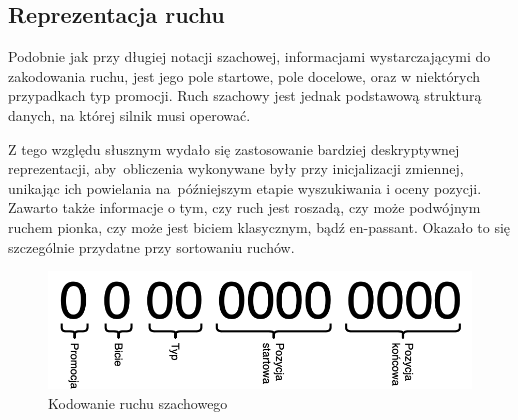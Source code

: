 \subsection{Reprezentacja ruchu}
\label{subsec:reprezentacja-ruchu}

Podobnie jak przy długiej notacji szachowej, informacjami wystarczającymi do zakodowania ruchu, jest jego pole startowe, pole docelowe, oraz w niektórych przypadkach typ promocji.
Ruch szachowy jest jednak podstawową strukturą danych, na której silnik musi operować.

Z tego względu słusznym wydało się zastosowanie bardziej deskryptywnej reprezentacji, aby~obliczenia wykonywane były przy inicjalizacji zmiennej, unikając ich powielania na~późniejszym etapie wyszukiwania i oceny pozycji.
Zawarto także informacje o tym, czy ruch jest roszadą, czy może podwójnym ruchem pionka, czy może jest biciem klasycznym, bądź en-passant.
Okazało to się szczególnie przydatne przy sortowaniu ruchów.

\begin{figure}[ht]
    \centering
    \includegraphics[width=0.85\linewidth]{rozdzialy/rozdzial01/2_reprezentacja-pozycji/rysunki/kodowanie_ruchu}
    \caption{Kodowanie ruchu szachowego}
    \label{fig:kodowanie-ruchu}
\end{figure}

